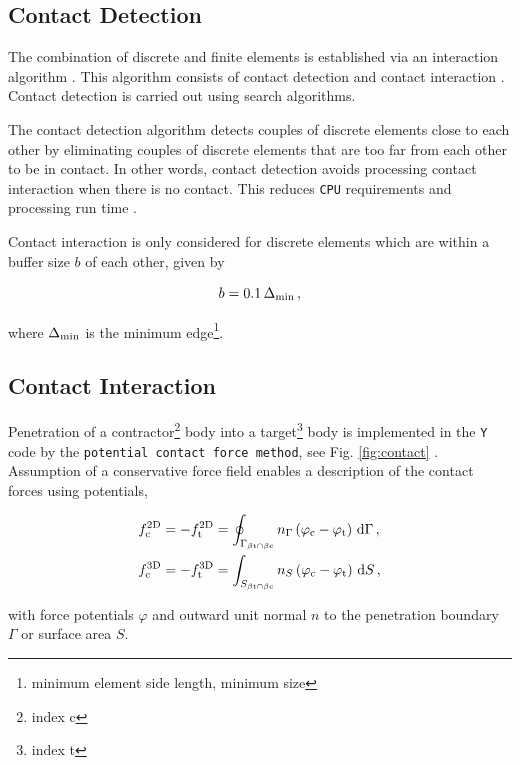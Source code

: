\subsection{Contact Detection}

The combination of discrete and finite elements is established via an interaction algorithm \cite{Lei16}. This algorithm consists of contact detection \cite{Che15} and contact interaction \cite{Mun13}. Contact detection is carried out using search algorithms. 

\bigbreak
The contact detection algorithm detects couples of discrete elements close to each other by eliminating couples of discrete elements that are too far from each other to be in contact. In other words, contact detection avoids processing contact interaction when there is no contact. This reduces \texttt{CPU} requirements and processing run time \cite{Mun04}.

\bigbreak
Contact interaction is only considered for discrete elements which are within a buffer size $b$ of each other, given by

\begin{equation}
    \label{eq:buff}
    b = 0.1\,\Delta_{\rm{min}}\,,
\end{equation}

where $\Delta_{\rm{min}}$ is the minimum edge\footnote{minimum element side length, minimum size}.

\subsection{Contact Interaction}

Penetration of a contractor\footnote{index c} body into a target\footnote{index t} body is implemented in the \texttt{Y} code by the \texttt{potential contact force method}, see Fig. \ref{fig:contact} \cite{Mun04}. Assumption of a conservative force field enables a description of the contact forces using potentials,

\begin{align}
    f_{\rm{c}}^{\rm{2D}}&=-f_{\rm{t}}^{\rm{2D}}=\oint_{\Gamma_{\beta{\rm{t}}\cap\beta{\rm{c}}}}n_{\Gamma}\left(\varphi_{\rm{c}}-\varphi_{\rm{t}}\right)\,{\rm{d}}\Gamma\,,\\
    f_{\rm{c}}^{\rm{3D}}&=-f_{\rm{t}}^{\rm{3D}}=\int_{S_{\beta{\rm{t}}\cap\beta{\rm{c}}}}n_{S}\left(\varphi_{\rm{c}}-\varphi_{\rm{t}}\right)\,{\rm{d}}S\,,
\end{align}

with force potentials $\varphi$ and outward unit normal $n$ to the penetration boundary $\Gamma$ or surface area $S$.

